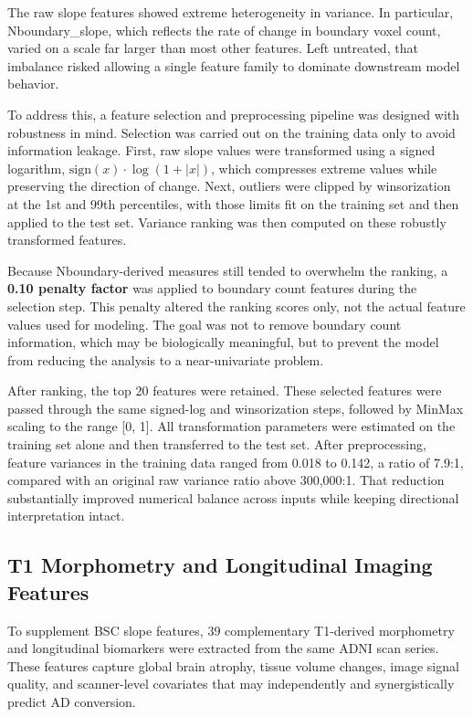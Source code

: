 \documentclass[blue]{ludusofficial}
\begin{document}
The raw slope features showed extreme heterogeneity in variance. In particular, Nboundary\_slope, which reflects the rate of change in boundary voxel count, varied on a scale far larger than most other features. Left untreated, that imbalance risked allowing a single feature family to dominate downstream model behavior.

To address this, a feature selection and preprocessing pipeline was designed with robustness in mind. Selection was carried out on the training data only to avoid information leakage. First, raw slope values were transformed using a signed logarithm, $\text{sign}(x) \cdot \log(1 + |x|)$, which compresses extreme values while preserving the direction of change. Next, outliers were clipped by winsorization~\cite{winsorization} at the 1st and 99th percentiles, with those limits fit on the training set and then applied to the test set. Variance ranking was then computed on these robustly transformed features.

Because Nboundary-derived measures still tended to overwhelm the ranking, a \textbf{0.10 penalty factor} was applied to boundary count features during the selection step. This penalty altered the ranking scores only, not the actual feature values used for modeling. The goal was not to remove boundary count information, which may be biologically meaningful, but to prevent the model from reducing the analysis to a near-univariate problem.

After ranking, the top 20 features were retained. These selected features were passed through the same signed-log and winsorization steps, followed by MinMax scaling to the range [0, 1]. All transformation parameters were estimated on the training set alone and then transferred to the test set. After preprocessing, feature variances in the training data ranged from 0.018 to 0.142, a ratio of 7.9:1, compared with an original raw variance ratio above 300{,}000:1. That reduction substantially improved numerical balance across inputs while keeping directional interpretation intact.

\subsection{T1 Morphometry and Longitudinal Imaging Features}

To supplement BSC slope features, 39 complementary T1-derived morphometry and longitudinal biomarkers were extracted from the same ADNI scan series. These features capture global brain atrophy, tissue volume changes, image signal quality, and scanner-level covariates that may independently and synergistically predict AD conversion.
\end{document}
